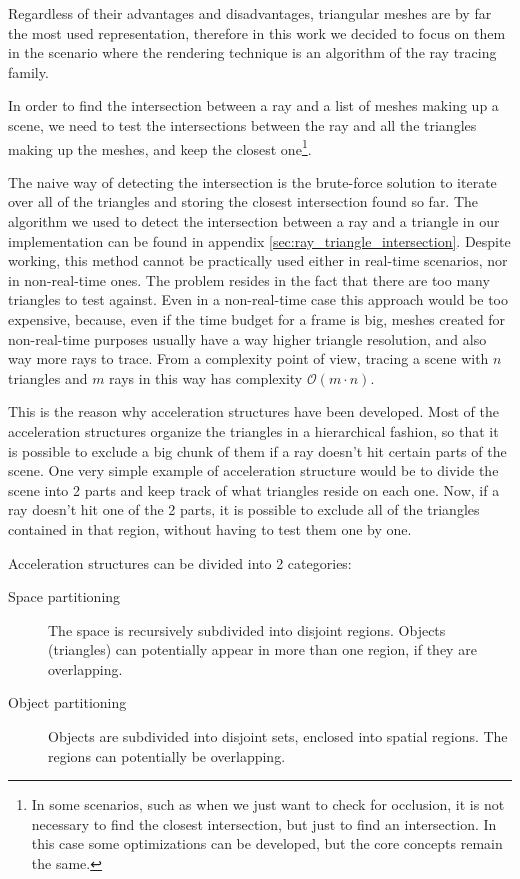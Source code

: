 \documentclass{PoliMi_MasterThesis}
\begin{document}
Regardless of their advantages and disadvantages, triangular meshes are by far the most used representation, therefore in this work we decided to focus on them in the scenario where the rendering technique is an algorithm of the ray tracing family.

In order to find the intersection between a ray and a list of meshes making up a scene, we need to test the intersections between the ray and all the triangles making up the meshes, and keep the closest one\footnote{In some scenarios, such as when we just want to check for occlusion, it is not necessary to find the closest intersection, but just to find an intersection. In this case some optimizations can be developed, but the core concepts remain the same.}.

The naive way of detecting the intersection is the brute-force solution to iterate over all of the triangles and storing the closest intersection found so far. The algorithm we used to detect the intersection between a ray and a triangle in our implementation can be found in appendix \ref{sec:ray_triangle_intersection}. Despite working, this method cannot be practically used either in real-time scenarios, nor in non-real-time ones. The problem resides in the fact that there are too many triangles to test against. Even in a non-real-time case this approach would be too expensive, because, even if the time budget for a frame is big, meshes created for non-real-time purposes usually have a way higher triangle resolution, and also way more rays to trace. From a complexity point of view, tracing a scene with $n$ triangles and $m$ rays in this way has complexity $\mathcal{O}(m\cdot n)$.

This is the reason why acceleration structures have been developed. Most of the acceleration structures organize the triangles in a hierarchical fashion, so that it is possible to exclude a big chunk of them if a ray doesn't hit certain parts of the scene. One very simple example of acceleration structure would be to divide the scene into 2 parts and keep track of what triangles reside on each one. Now, if a ray doesn't hit one of the 2 parts, it is possible to exclude all of the triangles contained in that region, without having to test them one by one.

Acceleration structures can be divided into 2 categories:
\begin{description}
	\item[Space partitioning] The space is recursively subdivided into disjoint regions. Objects (triangles) can potentially appear in more than one region, if they are overlapping. 
	\item[Object partitioning] Objects are subdivided into disjoint sets, enclosed into spatial regions. The regions can potentially be overlapping.  
\end{description}
\end{document}
